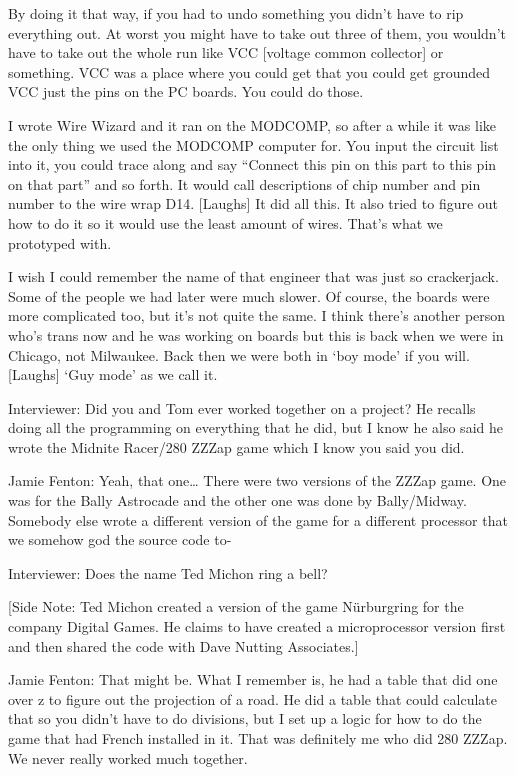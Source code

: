 By doing it that way, if you had to undo something you didn’t have to rip everything out. At worst you might have to take out three of them, you wouldn’t have to take out the whole run like VCC [voltage common collector] or something. VCC was a place where you could get that you could get grounded VCC just the pins on the PC boards. You could do those.

I wrote Wire Wizard and it ran on the MODCOMP, so after a while it was like the only thing we used the MODCOMP computer for. You input the circuit list into it, you could trace along and say “Connect this pin on this part to this pin on that part” and so forth. It would call descriptions of chip number and pin number to the wire wrap D14. [Laughs] It did all this. It also tried to figure out how to do it so it would use the least amount of wires. That’s what we prototyped with.

I wish I could remember the name of that engineer that was just so crackerjack. Some of the people we had later were much slower. Of course, the boards were more complicated too, but it’s not quite the same. I think there’s another person who’s trans now and he was working on boards but this is back when we were in Chicago, not Milwaukee. Back then we were both in ‘boy mode’ if you will. [Laughs] ‘Guy mode’ as we call it.

\textcolor{interviewer}{Interviewer:} Did you and Tom ever worked together on a project? He recalls doing all the programming on everything that he did, but I know he also said he wrote the Midnite Racer/280 ZZZap game which I know you said you did.

\textcolor{interviewee}{Jamie Fenton:} Yeah, that one… There were two versions of the ZZZap game. One was for the Bally Astrocade and the other one was done by Bally/Midway. Somebody else wrote a different version of the game for a different processor that we somehow god the source code to-

\textcolor{interviewer}{Interviewer:} Does the name Ted Michon ring a bell?

[Side Note: Ted Michon created a version of the game Nürburgring for the company Digital Games. He claims to have created a microprocessor version first and then shared the code with Dave Nutting Associates.]

\textcolor{interviewee}{Jamie Fenton:} That might be. What I remember is, he had a table that did one over z to figure out the projection of a road. He did a table that could calculate that so you didn’t have to do divisions, but I set up a logic for how to do the game that had French installed in it. That was definitely me who did 280 ZZZap. We never really worked much together.

